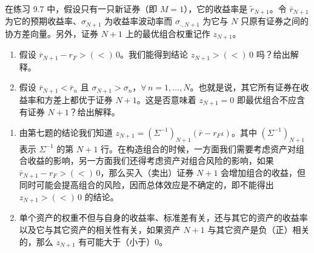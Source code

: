 \begin{problem}
 在练习 9.7 中，假设只有一只新证券（即 $M=1$），它的收益率是 $\tilde{r}_{N+1}$。令 $\bar{r}_{N+1}$ 为它的预期收益率、$\sigma_{N+1}$ 为收益率波动率而 $\sigma_{\cdot,N+1}$ 为它与 $N$ 只原有证券之间的协方差向量。另外，证券 $N+1$ 上的最优组合权重记作 $z_{N+1}$。
\begin{enumerate}[label=(\alph*)]
    \item 假设 $\bar{r}_{N+1}-r_{F}>(<)\,0$。我们能得到结论 $z_{N+1}>(<)\,0$ 吗？给出解释。
    \item 假设 $\bar{r}_{N+1}<\bar{r}_{n}$ 且 $\sigma_{N+1}>\sigma_{n}$，$\forall\,n=1,\ldots,N$。也就是说，其它所有证券在收益率和方差上都优于证券 $N+1$。这是否意味着 $z_{N+1}=0$ 即最优组合不应含有证券 $N+1$？给出解释。
\end{enumerate}
\end{problem}
\begin{solution}
\begin{enumerate}[label=(\alph*)]
    \item 由第七题的结论我们知道 $z_{N+1}=(\Sigma^{-1})_{N+1}(\bar{r}-r_{F}\iota)$。其中 $(\Sigma^{-1})_{N+1}$ 表示 $\Sigma^{-1}$ 的第 $N+1$ 行。在构造组合的时候，一方面我们需要考虑资产对组合收益的影响，另一方面我们还得考虑资产对组合风险的影响，如果 $\bar{r}_{N+1}-r_{F}>(<)\,0$，那么买入（卖出）证券 $N+1$ 会增加组合的收益，但同时可能会提高组合的风险，因而总体效应是不确定的，即不能得出 $z_{N+1}>(<)\,0$ 的结论。

    \item 单个资产的权重不但与自身的收益率、标准差有关，还与其它的资产的收益率以及它与其它资产的相关性有关，如果资产 $N+1$ 与其它资产是负（正）相关的，那么 $z_{N+1}$ 有可能大于（小于）0。
\end{enumerate}
\end{solution}

